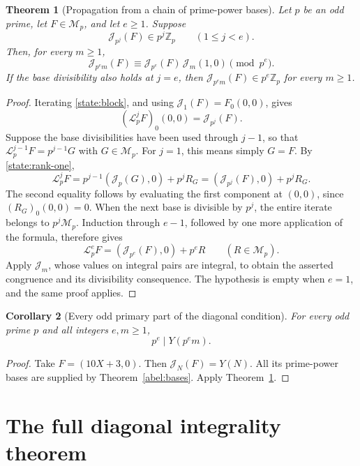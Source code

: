 \documentclass[11pt,a4paper]{article}
\newtheorem{theorem}{Theorem}[section]
\newtheorem{corollary}[theorem]{Corollary}
\theoremstyle{remark}\newtheorem{remark}[theorem]{Remark}
\newcommand{\Z}{\mathbb Z}\newcommand{\Q}{\mathbb Q}
\begin{document}
\begin{theorem}[Propagation from a chain of prime-power bases]\label{state:propagation}
Let \(p\) be an odd prime, let \(F\in\mathcal M_p\), and let \(e\ge1\).
Suppose
\[
 \mathcal J_{p^j}(F)\in p^j\Z_p\qquad(1\le j<e).
\]
Then, for every \(m\ge1\),
\[
 \mathcal J_{p^em}(F)\equiv
 \mathcal J_{p^e}(F)\,\mathcal J_m(1,0)\pmod{p^e}.
\]
If the base divisibility also holds at \(j=e\), then
\(\mathcal J_{p^em}(F)\in p^e\Z_p\) for every \(m\ge1\).
\end{theorem}
\begin{proof}
Iterating \eqref{state:block}, and using \(\mathcal J_1(F)=F_0(0,0)\), gives
\[
                 (\mathcal L_p^jF)_0(0,0)=\mathcal J_{p^j}(F).
\]
Suppose the base divisibilities have been used through \(j-1\), so that
\(\mathcal L_p^{j-1}F=p^{j-1}G\) with \(G\in\mathcal M_p\).
For \(j=1\), this means simply \(G=F\).
By \eqref{state:rank-one},
\[
 \mathcal L_p^jF
 =p^{j-1}(\mathcal J_p(G),0)+p^jR_G
 =(\mathcal J_{p^j}(F),0)+p^jR_G.
\]
The second equality follows by evaluating the first component at \((0,0)\),
since \((R_G)_0(0,0)=0\).
When the next base is divisible by \(p^j\), the entire iterate belongs
to \(p^j\mathcal M_p\). Induction through \(e-1\), followed by one more
application of the formula, therefore gives
\[
 \mathcal L_p^eF=(\mathcal J_{p^e}(F),0)+p^eR
 \qquad(R\in\mathcal M_p).
\]
Apply \(\mathcal J_m\), whose values on integral pairs are integral, to
obtain the asserted congruence and its divisibility consequence.
The hypothesis is empty when \(e=1\), and the same proof applies.
\end{proof}

\begin{corollary}[Every odd primary part of the diagonal condition]\label{state:all-odd}
For every odd prime \(p\) and all integers \(e,m\ge1\),
\[
                              p^e\mid Y(p^em).
\]
\end{corollary}
\begin{proof}
Take \(F=(10X+3,0)\). Then \(\mathcal J_N(F)=Y(N)\).
All its prime-power bases are supplied by Theorem~\ref{abel:bases}.
Apply Theorem~\ref{state:propagation}.
\end{proof}

\section{The full diagonal integrality theorem}
\label{sec:diagonal-complete}
\end{document}
